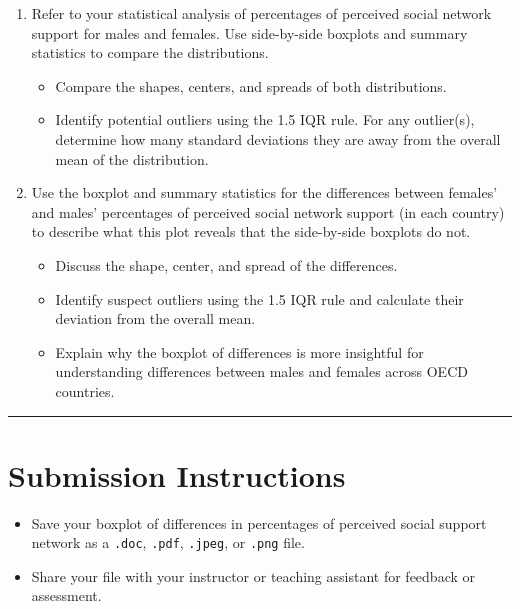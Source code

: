 \documentclass[oneside,openany]{book}
\providecommand{\tightlist}{%
  \setlength{\itemsep}{0pt}\setlength{\parskip}{0pt}}
\begin{document}
\begin{enumerate}
\def\labelenumi{\arabic{enumi}.}
\tightlist
\item
  Refer to your statistical analysis of percentages of perceived social network support for males and females. Use side-by-side boxplots and summary statistics to compare the distributions. \bigbreak

  \begin{itemize}
  \tightlist
  \item
    Compare the shapes, centers, and spreads of both distributions.
  \item
    Identify potential outliers using the 1.5 IQR rule. For any outlier(s), determine how many standard deviations they are away from the overall mean of the distribution.
  \end{itemize}
\item
  Use the boxplot and summary statistics for the differences between females' and males' percentages of perceived social network support (in each country) to describe what this plot reveals that the side-by-side boxplots do not.\bigbreak

  \begin{itemize}
  \tightlist
  \item
    Discuss the shape, center, and spread of the differences.
  \item
    Identify suspect outliers using the 1.5 IQR rule and calculate their deviation from the overall mean.
  \item
    Explain why the boxplot of differences is more insightful for understanding differences between males and females across OECD countries.
  \end{itemize}
\end{enumerate}

\begin{center}\rule{0.5\linewidth}{0.5pt}\end{center}

\section{Submission Instructions}\label{submission-instructions-1}

\begin{itemize}
\tightlist
\item
  Save your boxplot of differences in percentages of perceived social support network as a \texttt{.doc}, \texttt{.pdf}, \texttt{.jpeg}, or \texttt{.png} file.
\item
  Share your file with your instructor or teaching assistant for feedback or assessment.
\end{itemize}
\end{document}
